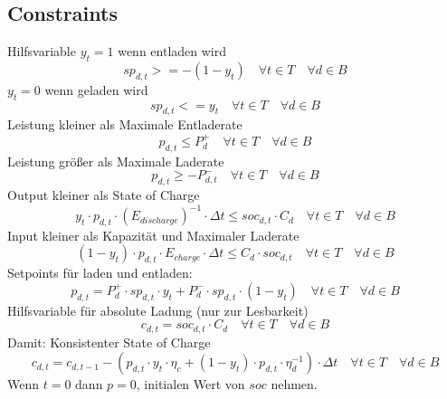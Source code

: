 \documentclass[]{article}
\begin{document}
\subsection{Constraints}
Hilfsvariable $y_{t} = 1$ wenn entladen wird
\begin{equation}
    sp_{d,t} >= -(1 - y_{t}) \quad \forall t \in T \quad \forall d \in B
\end{equation}
$y_{t} = 0$ wenn geladen wird
\begin{equation}
    sp_{d,t} <= y_{t} \quad \forall t \in T \quad \forall d \in B
\end{equation}
Leistung kleiner als Maximale Entladerate
\begin{equation}
    p_{d,t} \leq P_{d}^{+} \quad \forall t \in T \quad \forall d \in B
\end{equation}
Leistung größer als Maximale Laderate
\begin{equation}
    p_{d,t} \geq - P_{d,t}^{-} \quad \forall t \in T \quad \forall d \in B
\end{equation}
Output kleiner als State of Charge
\begin{equation}
    y_{t} \cdot p_{d,t} \cdot (E_{discharge})^{-1} \cdot \Delta t\leq soc_{d,t} \cdot C_{d} \quad \forall t \in T \quad \forall d \in B
\end{equation}
Input kleiner als Kapazität und Maximaler Laderate
\begin{equation}
    (1 - y_{t}) \cdot p_{d,t} \cdot E_{charge} \cdot \Delta t \leq C_{d} \cdot soc_{d,t} \quad \forall t \in T \quad \forall d \in B
\end{equation}
Setpoints für laden und entladen:
\begin{equation}
    p_{d,t} = P_{d}^{+} \cdot sp_{d,t} \cdot y_{t} + P_{d}^{-} \cdot  sp_{d,t} \cdot (1 - y_{t})\quad \forall t \in T \quad \forall d \in B
\end{equation}
Hilfsvariable für absolute Ladung (nur zur Lesbarkeit)
\begin{equation}
    c_{d,t} = soc_{d,t} \cdot C_{d} \quad \forall t \in T \quad \forall d \in B
\end{equation}
Damit: Konsistenter State of Charge
\begin{equation}
    c_{d,t} = c_{d,t-1} - (p_{d,t} \cdot y_{t} \cdot \eta_{c} + (1 - y_{t}) \cdot p_{d,t} \cdot \eta_{d}^{-1}) \cdot \Delta t \quad \forall t \in T \quad \forall d \in B
\end{equation}
Wenn $t=0$ dann $p = 0$, initialen Wert von $soc$ nehmen.
\end{document}
